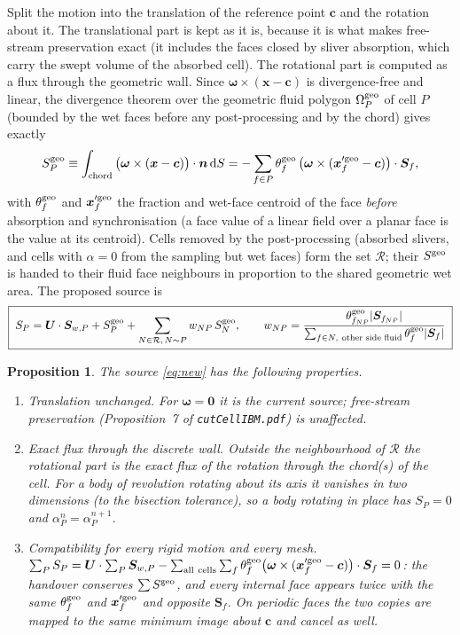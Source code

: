 \documentclass[11pt,a4paper]{article}
\newtheorem{proposition}{Proposition}
\theoremstyle{remark}
\newcommand{\nn}{\bm{n}}
\newcommand{\xx}{\bm{x}}
\newcommand{\Sf}{\bm{S}_f}
\newcommand{\dd}{\,\mathrm{d}}
\newcommand{\code}[1]{\texttt{#1}}
\newcommand{\w}{\bm\omega}
\begin{document}
Split the motion into the translation of the reference point $\bm c$ and the rotation about it.
The translational part is kept as it is, because it is what makes free-stream preservation exact
(it includes the faces closed by sliver absorption, which carry the swept volume of the absorbed
cell). The rotational part is computed as a flux through the geometric wall. Since
$\w\times(\xx-\bm c)$ is divergence-free and linear, the divergence theorem over the geometric
fluid polygon $\Omega^{\rm geo}_P$ of cell $P$ (bounded by the wet faces before any
post-processing and by the chord) gives exactly
\begin{equation}
S^{\rm geo}_P\equiv\int_{\text{chord}}\big(\w\times(\xx-\bm c)\big)\cdot\nn\dd S
=-\sum_{f\in P}\theta^{\rm geo}_f\,\big(\w\times(\xx'^{\rm geo}_f-\bm c)\big)\cdot\Sf ,
\label{eq:Sgeo}
\end{equation}
with $\theta^{\rm geo}_f$ and $\xx'^{\rm geo}_f$ the fraction and wet-face centroid of the face
\emph{before} absorption and synchronisation (a face value of a linear field over a planar face
is the value at its centroid). Cells removed by the post-processing (absorbed slivers, and cells
with $\alpha=0$ from the sampling but wet faces) form the set $\mathcal R$; their $S^{\rm geo}$ is
handed to their fluid face neighbours in proportion to the shared geometric wet area. The
proposed source is
\begin{equation}
\boxed{\;S_P=\bm U\cdot\bm S_{w,P}+S^{\rm geo}_P+\sum_{N\in\mathcal R,\,N\sim P}w_{NP}\,S^{\rm geo}_N,
\qquad w_{NP}=\frac{\theta^{\rm geo}_{f_{NP}}|\bm S_{f_{NP}}|}
{\sum_{f\in N,\ \text{other side fluid}}\theta^{\rm geo}_f|\Sf|}\;}
\label{eq:new}
\end{equation}

\begin{proposition}
\label{prop:source}
The source \eqref{eq:new} has the following properties.
\begin{enumerate}\itemsep1pt
\item \emph{Translation unchanged.} For $\w=\bm 0$ it is the current source; free-stream
      preservation (Proposition~7 of \code{cutCellIBM.pdf}) is unaffected.
\item \emph{Exact flux through the discrete wall.} Outside the neighbourhood of $\mathcal R$ the
      rotational part is the exact flux of the rotation through the chord(s) of the cell. For a
      body of revolution rotating about its axis it vanishes in two dimensions (to the bisection
      tolerance), so a body rotating in place has $S_P=0$ and $\alpha^n_P=\alpha^{n+1}_P$.
\item \emph{Compatibility for every rigid motion and every mesh.}
      $\sum_PS_P=\bm U\cdot\sum_P\bm S_{w,P}-\sum_{\rm all\ cells}\sum_{f}\theta^{\rm geo}_f
      \big(\w\times(\xx'^{\rm geo}_f-\bm c)\big)\cdot\Sf=0$: the handover conserves
      $\sum S^{\rm geo}$, and every internal face appears twice with the same $\theta^{\rm geo}_f$
      and $\xx'^{\rm geo}_f$ and opposite $\Sf$. On periodic faces the two copies are mapped to
      the same minimum image about $\bm c$ and cancel as well.
\end{enumerate}
\end{proposition}
\end{document}
